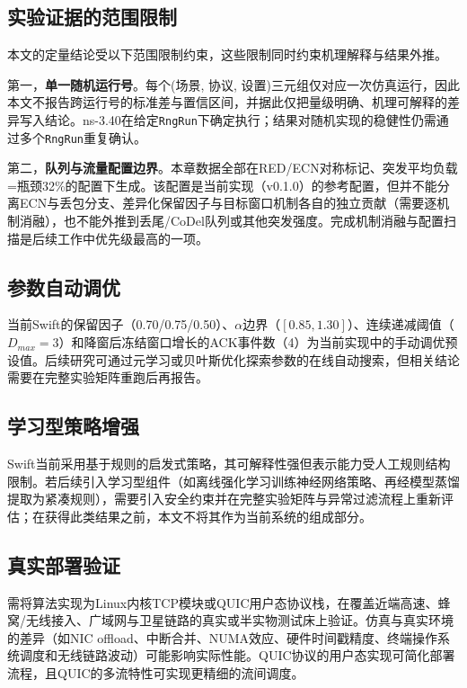 \subsection{实验证据的范围限制}

本文的定量结论受以下范围限制约束，这些限制同时约束机理解释与结果外推。

第一，\textbf{单一随机运行号}。每个(场景, 协议, 设置)三元组仅对应一次仿真运行，因此本文不报告跨运行号的标准差与置信区间，并据此仅把量级明确、机理可解释的差异写入结论。ns-3.40在给定\texttt{RngRun}下确定执行；结果对随机实现的稳健性仍需通过多个\texttt{RngRun}重复确认。

第二，\textbf{队列与流量配置边界}。本章数据全部在RED/ECN对称标记、突发平均负载=瓶颈32\%的配置下生成。该配置是当前实现（v0.1.0）的参考配置，但并不能分离ECN与丢包分支、差异化保留因子与目标窗口机制各自的独立贡献（需要逐机制消融），也不能外推到丢尾/CoDel队列或其他突发强度。完成机制消融与配置扫描是后续工作中优先级最高的一项。

\subsection{参数自动调优}

当前Swift的保留因子（0.70/0.75/0.50）、$\alpha$边界（$[0.85,1.30]$）、连续递减阈值（$D_{max}=3$）和降窗后冻结窗口增长的ACK事件数（4）为当前实现中的手动调优预设值。后续研究可通过元学习或贝叶斯优化探索参数的在线自动搜索，但相关结论需要在完整实验矩阵重跑后再报告。

\subsection{学习型策略增强}

Swift当前采用基于规则的启发式策略，其可解释性强但表示能力受人工规则结构限制。若后续引入学习型组件（如离线强化学习训练神经网络策略、再经模型蒸馏提取为紧凑规则），需要引入安全约束并在完整实验矩阵与异常过滤流程上重新评估；在获得此类结果之前，本文不将其作为当前系统的组成部分。

\subsection{真实部署验证}

需将算法实现为Linux内核TCP模块或QUIC用户态协议栈，在覆盖近端高速、蜂窝/无线接入、广域网与卫星链路的真实或半实物测试床上验证。仿真与真实环境的差异（如NIC offload、中断合并、NUMA效应、硬件时间戳精度、终端操作系统调度和无线链路波动）可能影响实际性能。QUIC协议的用户态实现可简化部署流程，且QUIC的多流特性可实现更精细的流间调度。

